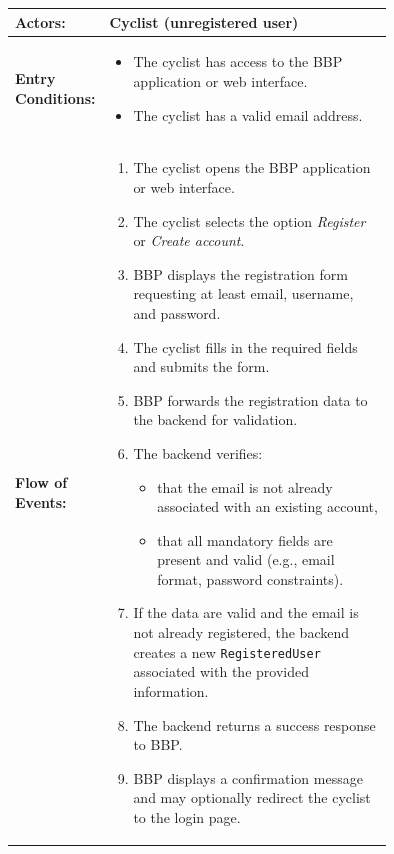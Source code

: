 \begin{center}
\begin{longtable}{|l|p{0.75\linewidth}|}
    \hline
    \textbf{Actors:}           
    & Cyclist (unregistered user)                                                                 \\
    \hline

    \textbf{Entry Conditions:} 
    & \begin{itemize}
          \item The cyclist has access to the BBP application or web interface.
          \item The cyclist has a valid email address.
       \end{itemize}                                                                              \\
    \hline

    \textbf{Flow of Events:}   
    & \begin{enumerate}
          \item The cyclist opens the BBP application or web interface.
          \item The cyclist selects the option \emph{Register} or \emph{Create account}.
          \item BBP displays the registration form requesting at least email, username, and password.
          \item The cyclist fills in the required fields and submits the form.
          \item BBP forwards the registration data to the backend for validation.
          \item The backend verifies:
                \begin{itemize}
                    \item that the email is not already associated with an existing account,
                    \item that all mandatory fields are present and valid (e.g., email format, password constraints).
                \end{itemize}
          \item If the data are valid and the email is not already registered, the backend creates a new \texttt{RegisteredUser} associated with the provided information.
          \item The backend returns a success response to BBP.
          \item BBP displays a confirmation message and may optionally redirect the cyclist to the login page.
       \end{enumerate}                                                                          \\
    \hline


\end{longtable}
\end{center}
